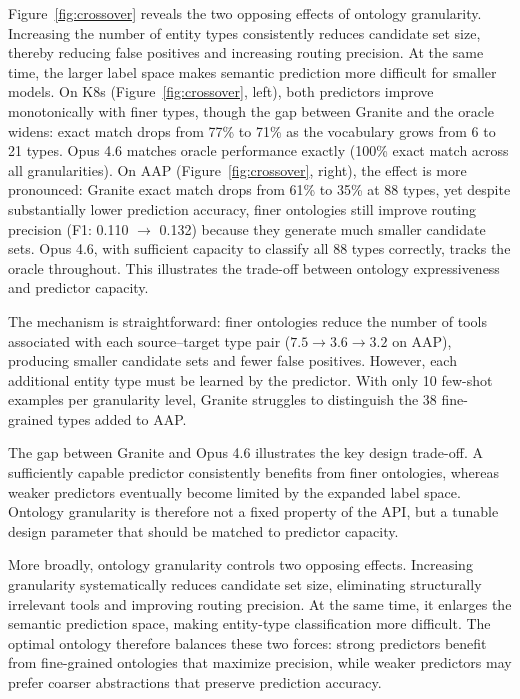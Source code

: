 \documentclass{article}
\begin{document}
Figure~\ref{fig:crossover} reveals the two opposing effects of ontology granularity. Increasing the number of entity types consistently reduces candidate set size, thereby reducing false positives and increasing routing precision. At the same time, the larger label space makes semantic prediction more difficult for smaller models. On K8s (Figure~\ref{fig:crossover}, left), both predictors improve monotonically with finer types, though the gap between Granite and the oracle widens: exact match drops from 77\% to 71\% as the vocabulary grows from 6 to 21 types. Opus 4.6 matches oracle performance exactly (100\% exact match across all granularities). On AAP (Figure~\ref{fig:crossover}, right), the effect is more pronounced: Granite exact match drops from 61\% to 35\% at 88 types, yet despite substantially lower prediction accuracy, finer ontologies still improve routing precision (F1: 0.110 $\rightarrow$ 0.132) because they generate much smaller candidate sets. Opus 4.6, with sufficient capacity to classify all 88 types correctly, tracks the oracle throughout. This illustrates the trade-off between ontology expressiveness and predictor capacity.

The mechanism is straightforward: finer ontologies reduce the number of tools associated with each source--target type pair ($7.5 \rightarrow 3.6 \rightarrow 3.2$ on AAP), producing smaller candidate sets and fewer false positives. However, each additional entity type must be learned by the predictor. With only 10 few-shot examples per granularity level, Granite struggles to distinguish the 38 fine-grained types added to AAP.

The gap between Granite and Opus 4.6 illustrates the key design trade-off. A sufficiently capable predictor consistently benefits from finer ontologies, whereas weaker predictors eventually become limited by the expanded label space. Ontology granularity is therefore not a fixed property of the API, but a tunable design parameter that should be matched to predictor capacity.

More broadly, ontology granularity controls two opposing effects. Increasing granularity systematically reduces candidate set size, eliminating structurally irrelevant tools and improving routing precision. At the same time, it enlarges the semantic prediction space, making entity-type classification more difficult. The optimal ontology therefore balances these two forces: strong predictors benefit from fine-grained ontologies that maximize precision, while weaker predictors may prefer coarser abstractions that preserve prediction accuracy.
\end{document}
